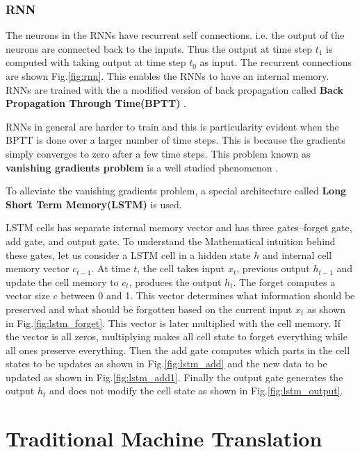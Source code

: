 \documentclass[a4paper]{article}
\begin{document}
\subsubsection{RNN}

The neurons in the RNNs have recurrent  self connections. i.e. the output of the
neurons are  connected back to the inputs. Thus the output at time step $t_1$ is
computed  with  taking output  at  time  step  $t_0$  as  input.  The  recurrent
connections  are  shown  Fig.\ref{fig:rnn}.  This  enables the  RNNs to  have an
internal  memory.  RNNs  are  trained  with  the  a  modified  version  of  back
propagation    called    \textbf{Back    Propagation     Through     Time(BPTT)}
\cite{werbos1990backpropagation}.

RNNs in general are harder  to  train and this is particularity evident when the
BPTT is done over a larger number of time steps.  This is because the  gradients
simply converges  to  zero after  a  few  time  steps.  This  problem  known  as
\textbf{vanishing   gradients   problem}    is   a   well   studied   phenomenon
\cite{bengio1994learning}.

To  alleviate  the  vanishing  gradients  problem, a special architecture called
\textbf{Long Short Term Memory(LSTM)} \cite{hochreiter1997long} is used.

LSTM cells has separate internal memory vector and has three gates--forget gate,
add gate, and output gate. To understand the Mathematical intuition behind these
gates, let  us consider a  LSTM cell  in a  hidden state  $h$ and  internal cell
memory vector  $c_{t-1}$.  At  time  $t$,  the cell takes  input $x_t$, previous
output $h_{t-1}$ and update  the  cell memory to  $c_{t}$, produces  the  output
$h_{t}$. The forget  computes  a  vector size $c$  between  0 and 1. This vector
determines what  information should be preserved  and what  should  be forgotten
based  on the  current  input $x_t$ as shown in  Fig.\ref{fig:lstm_forget}. This
vector is later  multiplied with  the cell memory.  If the vector  is all zeros,
multiplying makes  all cell state to forget everything  while all ones  preserve
everything. Then the add gate  computes  which parts  in  the cell states  to be
updates as  shown in Fig.\ref{fig:lstm_add}  and the new  data to be updated  as
shown  in Fig.\ref{fig:lstm_add1}. Finally the output gate generates the  output
$h_t$ and does not modify the cell state as shown in Fig.\ref{fig:lstm_output}.


\section{Traditional Machine Translation}
\end{document}
